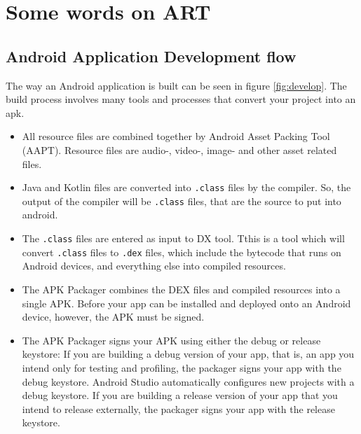 \section{Some words on ART}
\subsection{Android Application Development flow}
The way an Android application is built can be seen in figure \ref{fig:develop}. The build process involves many tools and processes that convert your project into an \gls{apk}.

\begin{itemize}
	\item All resource files are combined together by Android Asset Packing Tool (AAPT). Resource files are audio-, video-, image-  and other asset related files. 
	\item Java and Kotlin files are converted into \texttt{.class} files by the compiler. So, the output of the compiler will be \texttt{.class} files, that are the source to put into android. 	\item The \texttt{.class}  files are entered as input to DX tool. Tthis is a tool which will convert \texttt{.class} files to \texttt{.dex} 	 files, which include the bytecode that runs on Android devices, and everything else into compiled resources.
	\item The APK Packager combines the DEX files and compiled resources into a single APK. Before your app can be installed and deployed onto an Android device, however, the APK must be signed.
	\item The APK Packager signs your APK using either the debug or release keystore:
	If you are building a debug version of your app, that is, an app you intend only for testing and profiling, the packager signs your app with the debug keystore. Android Studio automatically configures new projects with a debug keystore.
	If you are building a release version of your app that you intend to release externally, the packager signs your app with the release keystore.
\end{itemize}


